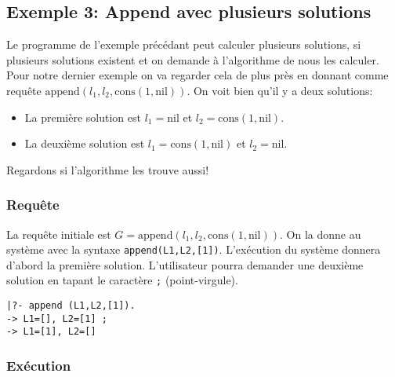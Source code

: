 \begin{center}
\noindent{}
\end{center}

\subsection{Exemple 3: Append avec plusieurs solutions}

Le programme de l'exemple précédant peut calculer plusieurs solutions,
si plusieurs solutions existent et on demande à l'algorithme de nous les calculer.
Pour notre dernier exemple on va regarder cela de plus près
en donnant comme requête $\mathrm{append}(l_1, l_2, \mathrm{cons}(1,\mathrm{nil}))$.
On voit bien qu'il y a deux solutions:
\begin{itemize}
\item La première solution est $l_1=\mathrm{nil}$ et $l_2=\mathrm{cons}(1,\mathrm{nil})$.
\item La deuxième solution est $l_1=\mathrm{cons}(1,\mathrm{nil})$ et $l_2=\mathrm{nil}$.
\end{itemize}
Regardons si l'algorithme les trouve aussi!

\subsubsection{Requête}

La requête initiale est $G = \mathrm{append}(l_1, l_2, \mathrm{cons}(1,\mathrm{nil}))$.
On la donne au système avec la syntaxe \verb+append(L1,L2,[1])+.
L'exécution du système donnera d'abord la première solution.
L'utilisateur pourra demander une deuxième solution en tapant le caractère \verb+;+ (point-virgule).
\begin{verbatim} 
|?- append (L1,L2,[1]).
-> L1=[], L2=[1] ;
-> L1=[1], L2=[]
\end{verbatim}

\subsubsection{Exécution}

